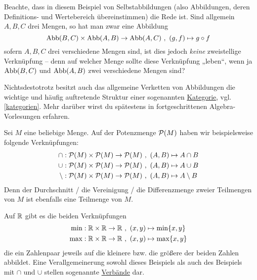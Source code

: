 \begin{bem}[*]
    Beachte, dass in diesem Beispiel von Selbstabbildungen (also Abbildungen, deren Definitions- und Wertebereich übereinstimmen) die Rede ist. Sind allgemein $A,B,C$ drei Mengen, so hat man zwar eine Abbildung
        \[ \Abb(B,C) \times \Abb(A,B) \to \Abb(A,C) \ ,\ (g,f) \mapsto g\circ f \]
    sofern $A,B,C$ drei verschiedene Mengen sind, ist dies jedoch \emph{keine} zweistellige Verknüpfung -- denn auf welcher Menge sollte diese Verknüpfung „leben“, wenn ja $\operatorname{Abb}(B,C)$ und $\operatorname{Abb}(A,B)$ zwei verschiedene Mengen sind?
    
    Nichtsdestotrotz besitzt auch das allgemeine Verketten von Abbildungen die wichtige und häufig auftretende Struktur einer sogenannten \href{https://ncatlab.org/nlab/show/category}{Kategorie}, vgl. \cref{kategorien}. Mehr darüber wirst du spätestens in fortgeschrittenen Algebra-Vorlesungen erfahren.
\end{bem}


\begin{bsp}
    Sei $M$ eine beliebige Menge. Auf der Potenzmenge $\mathcal P(M)$ haben wir beispielsweise folgende Verknüpfungen:
    \begin{align*}
        \cap : \calP(M)\times \calP(M) \to \calP(M) \ & ,\ (A,B)\mapsto A\cap B \\
        \cup : \calP(M)\times \calP(M) \to \calP(M) \ &,\ (A,B)\mapsto A\cup B \\
        \setminus : \calP(M)\times \calP(M) \to \calP(M) \ &,\ (A,B)\mapsto A\setminus B
    \end{align*}
    Denn der Durchschnitt / die Vereinigung / die Differenzmenge zweier Teilmengen von $M$ ist ebenfalls eine Teilmenge von $M$.
\end{bsp}


\begin{bsp} \label{bsp:minmaxverknuepfung}
    Auf $\mathbb R$ gibt es die beiden Verknüpfungen
    \begin{align*}
        \min : \mathbb R\times \mathbb R\to \mathbb R\ &,\ (x,y)\mapsto \min\{x,y\} \\
        \max : \mathbb R\times \mathbb R\to \mathbb R\ &,\ (x,y)\mapsto \max\{x,y\}
    \end{align*}
    die ein Zahlenpaar jeweils auf die kleinere bzw. die größere der beiden Zahlen abbildet. Eine Verallgemeinerung sowohl dieses Beispiels als auch des Beispiels mit $\cap$ und $\cup$ stellen sogenannte \href{https://de.wikipedia.org/wiki/Verband_(Mathematik)}{Verbände} dar.
\end{bsp}


